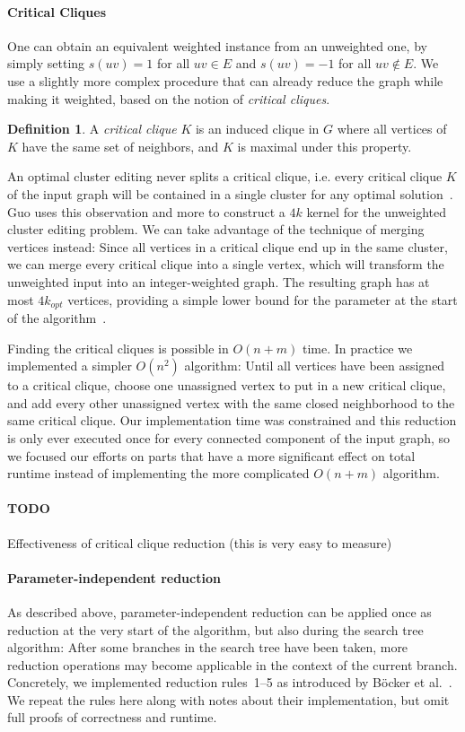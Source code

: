 \documentclass{article}
\newcommand{\todo}[1]{\paragraph{TODO} #1}
\theoremstyle{definition}
\newtheorem{definition}[theorem]{Definition}
\begin{document}
\paragraph{Critical Cliques} One can obtain an equivalent weighted instance from an unweighted one,
by simply setting $s(uv) = 1$ for all $uv \in E$ and $s(uv) = -1$ for all $uv \notin E$. We use a
slightly more complex procedure that can already reduce the graph while making it weighted, based on
the notion of \emph{critical cliques}.

\begin{definition}
	A \emph{critical clique} $K$ is an induced clique in $G$ where all vertices of $K$ have the same
	set of neighbors, and $K$ is maximal under this property. 
\end{definition}

An optimal cluster editing never splits a critical clique, i.e. every critical clique $K$ of the
input graph will be contained in a single cluster for any optimal solution~\cite{Guo}. Guo uses this
observation and more to construct a $4k$ kernel for the unweighted cluster editing problem. We can
take advantage of the technique of merging vertices instead: Since all vertices in a critical clique
end up in the same cluster, we can merge every critical clique into a single vertex, which will
transform the unweighted input into an integer-weighted graph. The resulting graph has at most
$4k_{opt}$ vertices, providing a simple lower bound for the parameter at the start of the
algorithm~\cite{GoingWeighted}\cite{Guo}.

Finding the critical cliques is possible in $O(n + m)$ time. In practice we implemented a simpler
$O(n^2)$ algorithm: Until all vertices have been assigned to a critical clique, choose one
unassigned vertex to put in a new critical clique, and add every other unassigned vertex with the
same closed neighborhood to the same critical clique. Our implementation time was constrained and
this reduction is only ever executed once for every connected component of the input graph, so we
focused our efforts on parts that have a more significant effect on total runtime instead of
implementing the more complicated $O(n + m)$ algorithm.

\todo Effectiveness of critical clique reduction (this is very easy to measure)

\paragraph{Parameter-independent reduction} As described above, parameter-independent reduction can
be applied once as reduction at the very start of the algorithm, but also during the search tree
algorithm: After some branches in the search tree have been taken, more reduction operations may
become applicable in the context of the current branch. Concretely, we implemented reduction
rules~1--5 as introduced by Böcker et al.~\cite{GoingWeighted}. We repeat the rules here along with
notes about their implementation, but omit full proofs of correctness and runtime.
\end{document}
